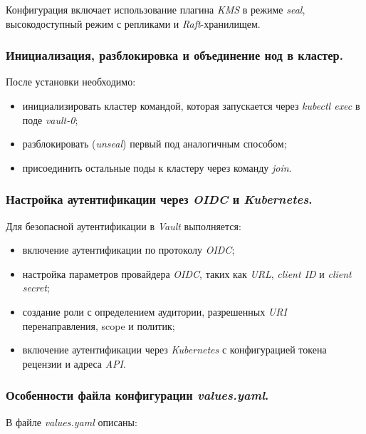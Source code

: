 Конфигурация включает использование плагина \textit{KMS} в режиме \textit{seal}, высокодоступный режим с репликами и \textit{Raft}-хранилищем.

\subsubsection{Инициализация, разблокировка и объединение нод в кластер.} После установки необходимо:

\begin{itemize}
    \item инициализировать кластер командой, которая запускается через \textit{kubectl exec} в поде \textit{vault-0};
    \item разблокировать (\textit{unseal}) первый под аналогичным способом;
    \item присоединить остальные поды к кластеру через команду \textit{join}.
\end{itemize}

\subsubsection{Настройка аутентификации через \textit{OIDC} и \textit{Kubernetes}.} Для безопасной аутентификации в \textit{Vault} выполняется:

\begin{itemize}
    \item включение аутентификации по протоколу \textit{OIDC};
    \item настройка параметров провайдера \textit{OIDC}, таких как \textit{URL}, \textit{client ID} и \textit{client secret};
    \item создание роли с определением аудитории, разрешенных \textit{URI} перенаправления, scope и политик;
    \item включение аутентификации через \textit{Kubernetes} с конфигурацией токена рецензии и адреса \textit{API}.
\end{itemize}

\subsubsection{Особенности файла конфигурации \textit{values.yaml}.} В файле \textit{values.yaml} описаны:

